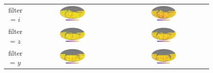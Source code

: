 \documentclass[preprintm,linenumbers]{aastex631}
\begin{document}
\begin{figure}
\begin{tabular}{c c c}
				filter = $i$ & \includegraphics[width=0.3\textwidth]{results/skymaps/skymaps_delta_first_year_one_snap_v4_0_10yrs_db_noDD_noTwi_CountMetric_doAllTemplateMetrics_reduceCount_i_7_noDD_noTwi} &				
				\includegraphics[width=0.3\textwidth]{results/skymaps/skymaps_delta_first_year_one_snap_v4_0_10yrs_db_noDD_noTwi_CountMetric_doAllTemplateMetrics_reduceCount_i_28_noDD_noTwi} \\
				
				
				filter = $z$ & \includegraphics[width=0.3\textwidth]{results/skymaps/skymaps_delta_first_year_one_snap_v4_0_10yrs_db_noDD_noTwi_CountMetric_doAllTemplateMetrics_reduceCount_z_7_noDD_noTwi} &			
				\includegraphics[width=0.3\textwidth]{results/skymaps/skymaps_delta_first_year_one_snap_v4_0_10yrs_db_noDD_noTwi_CountMetric_doAllTemplateMetrics_reduceCount_z_28_noDD_noTwi} \\
				
				filter = $y$ & \includegraphics[width=0.3\textwidth]{results/skymaps/skymaps_delta_first_year_one_snap_v4_0_10yrs_db_noDD_noTwi_CountMetric_doAllTemplateMetrics_reduceCount_y_7_noDD_noTwi} &				
				\includegraphics[width=0.3\textwidth]{results/skymaps/skymaps_delta_first_year_one_snap_v4_0_10yrs_db_noDD_noTwi_CountMetric_doAllTemplateMetrics_reduceCount_y_28_noDD_noTwi} \\
				

\end{tabular}
\end{figure}
\end{document}
